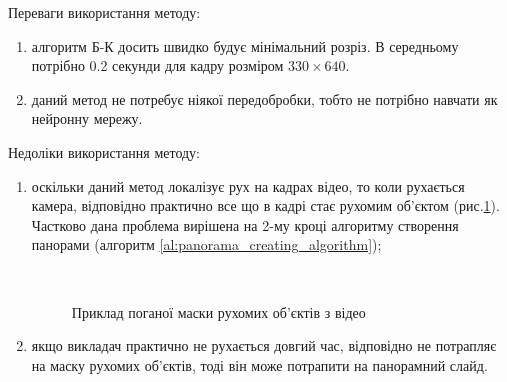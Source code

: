 Переваги використання методу:
\begin{enumerate}
    \item алгоритм Б-К досить швидко будує мінімальний розріз. В середньому
          потрібно 0.2 секунди для кадру розміром $330 \times 640$.
    \item даний метод не потребує ніякої передобробки, тобто не потрібно навчати
          як нейронну мережу.
\end{enumerate}

Недоліки використання методу:
\begin{enumerate}
    \item оскільки даний метод локалізує рух на кадрах відео, то коли
          рухається камера, відповідно практично все що в кадрі стає рухомим об'єктом
          (рис.\ref{fig:bk_bad_mask}).
          Частково дана проблема вирішена на 2-му кроці алгоритму створення панорами
          (алгоритм \ref{al:panorama_creating_algorithm});
          \begin{figure}[H]
              \centering

               \\
              \caption{Приклад поганої маски рухомих об'єктів з відео \cite{dorohovtsev_video}
                  \label{fig:bk_bad_mask}
              }
          \end{figure}

    \item якщо викладач практично не рухається довгий час, відповідно не потрапляє
          на маску рухомих об'єктів, тоді він може потрапити на панорамний слайд.
\end{enumerate}

